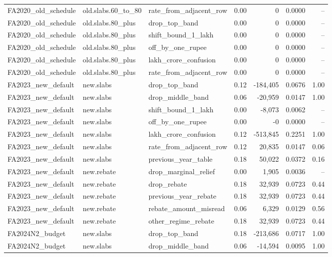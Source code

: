 \begin{table}[t]
\begin{tabular}{lllrrrr}
FA2020\_old\_schedule & old.slabs.60\_to\_80 & rate\_from\_adjacent\_row & 0.00 & 0 & 0.0000 & -- \\
FA2020\_old\_schedule & old.slabs.80\_plus & drop\_top\_band & 0.00 & 0 & 0.0000 & -- \\
FA2020\_old\_schedule & old.slabs.80\_plus & shift\_bound\_1\_lakh & 0.00 & 0 & 0.0000 & -- \\
FA2020\_old\_schedule & old.slabs.80\_plus & off\_by\_one\_rupee & 0.00 & 0 & 0.0000 & -- \\
FA2020\_old\_schedule & old.slabs.80\_plus & lakh\_crore\_confusion & 0.00 & 0 & 0.0000 & -- \\
FA2020\_old\_schedule & old.slabs.80\_plus & rate\_from\_adjacent\_row & 0.00 & 0 & 0.0000 & -- \\
FA2023\_new\_default & new.slabs & drop\_top\_band & 0.12 & -184,405 & 0.0676 & 1.00 \\
FA2023\_new\_default & new.slabs & drop\_middle\_band & 0.06 & -20,959 & 0.0147 & 1.00 \\
FA2023\_new\_default & new.slabs & shift\_bound\_1\_lakh & 0.00 & -8,073 & 0.0062 & -- \\
FA2023\_new\_default & new.slabs & off\_by\_one\_rupee & 0.00 & -0 & 0.0000 & -- \\
FA2023\_new\_default & new.slabs & lakh\_crore\_confusion & 0.12 & -513,845 & 0.2251 & 1.00 \\
FA2023\_new\_default & new.slabs & rate\_from\_adjacent\_row & 0.12 & 20,835 & 0.0147 & 0.06 \\
FA2023\_new\_default & new.slabs & previous\_year\_table & 0.18 & 50,022 & 0.0372 & 0.16 \\
FA2023\_new\_default & new.rebate & drop\_marginal\_relief & 0.00 & 1,905 & 0.0036 & -- \\
FA2023\_new\_default & new.rebate & drop\_rebate & 0.18 & 32,939 & 0.0723 & 0.44 \\
FA2023\_new\_default & new.rebate & previous\_year\_rebate & 0.18 & 32,939 & 0.0723 & 0.44 \\
FA2023\_new\_default & new.rebate & rebate\_amount\_misread & 0.06 & 6,329 & 0.0129 & 0.56 \\
FA2023\_new\_default & new.rebate & other\_regime\_rebate & 0.18 & 32,939 & 0.0723 & 0.44 \\
FA2024N2\_budget & new.slabs & drop\_top\_band & 0.18 & -213,686 & 0.0717 & 1.00 \\
FA2024N2\_budget & new.slabs & drop\_middle\_band & 0.06 & -14,594 & 0.0095 & 1.00 \\

\end{tabular}
\end{table}

